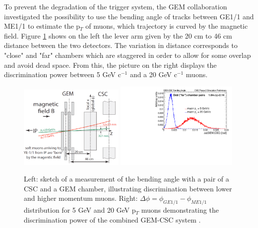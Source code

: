     To prevent the degradation of the trigger system, the GEM collaboration investigated the possibility to use the bending angle of tracks between GE1/1 and ME1/1 to estimate the p$_T$ of muons, which trajectory is curved by the magnetic field. Figure \ref{fig:II-1-csc-bending} shows on the left the lever arm given by the 20 cm to 46 cm distance between the two detectors. The variation in distance corresponds to "close" and "far" chambers which are staggered in order to allow for some overlap and avoid dead space. From this, the picture on the right displays the discrimination power between 5 GeV c$^{-1}$ and a 20 GeV c$^{-1}$ muons. \\

    \begin{figure}[h!]
      \centering
      \includegraphics[width=0.45\textwidth]{img/II-1-gem/gem-csc-bending-1.png}
      \includegraphics[width=0.53\textwidth]{img/II-1-gem/gem-csc-bending-2.pdf}
      \caption{Left: sketch of a measurement of the bending angle with a pair of a CSC and a GEM chamber, illustrating discrimination between lower and higher momentum muons. Right: $ \Delta \phi = \phi_{GE1/1} - \phi_{ME1/1} $ distribution for 5 GeV and 20 GeV p$_T$ muons demonstrating the discrimination power of the combined GEM-CSC system \cite{Colaleo:2021453}.}
      \label{fig:II-1-csc-bending}
    \end{figure}

